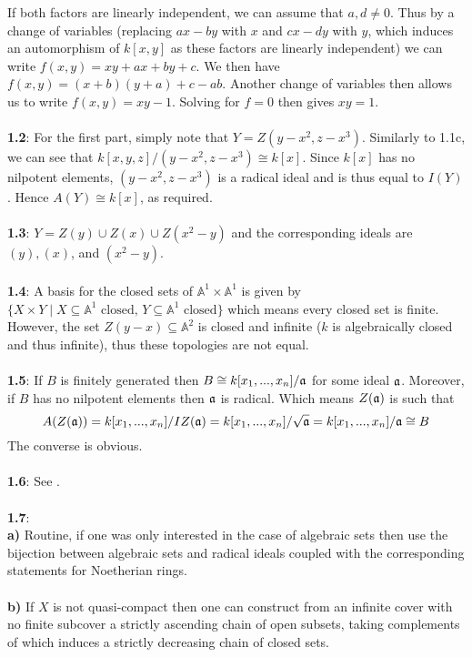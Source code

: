 \documentclass[12pt]{article}
\numberwithin{thm}{subsection}
\numberwithin{defn}{subsection}
\numberwithin{lemma}{subsection}
\numberwithin{example}{subsection}
\numberwithin{notation}{subsection}
\numberwithin{cor}{subsection}
\numberwithin{remark}{subsection}
\numberwithin{condition}{subsection}
\numberwithin{question}{subsection}
\numberwithin{construction}{subsection}
\numberwithin{construction}{subsection}
\numberwithin{construction}{subsection}
\newcommand{\bb}[1]{\mathbb{#1}}
\begin{document}
        If both factors are linearly independent, we can assume that $a,d\neq 0$. Thus by a change of variables (replacing $ax-by$ with $x$ and $cx-dy$ with $y$, which induces an automorphism of $k[x,y]$ as these factors are linearly independent) we can write $f(x,y)=xy+ax+by+c$. We then have $f(x,y)=(x+b)(y+a)+c-ab$. Another change of variables then allows us to write $f(x,y)=xy-1$. Solving for $f=0$ then gives $xy=1$.\\\\
%
\textbf{1.2}: For the first part, simply note that $Y=Z(y-x^2,z-x^3)$. Similarly to 1.1c, we can see that $k[x,y,z]/(y-x^2,z-x^3)\cong k[x]$. Since $k[x]$ has no nilpotent elements, $(y-x^2,z-x^3)$ is a radical ideal and is thus equal to $I(Y)$. Hence $A(Y)\cong k[x]$, as required.\\\\
%
\textbf{1.3}: $Y = Z(y) \cup Z(x) \cup Z(x^2 - y)$ and the corresponding ideals are $(y), (x)$, and $(x^2 - y)$.\\\\
%
\textbf{1.4}: A basis for the closed sets of $\bb{A}^1 \times \bb{A}^1$ is given by $\lbrace X \times Y \mid X \subseteq \bb{A}^1\text{ closed, }Y \subseteq \bb{A}^1\text{ closed}\rbrace$ which means every closed set is finite. However, the set $Z(y -x) \subseteq \bb{A}^2$ is closed and infinite ($k$ is algebraically closed and thus infinite), thus these topologies are not equal.\\\\
%
\textbf{1.5}: If $B$ is finitely generated then $B \cong k[x_1,...,x_n]/\frak{a}$ for some ideal $\frak{a}$. Moreover, if $B$ has no nilpotent elements then $\frak{a}$ is radical. Which means $Z(\frak{a})$ is such that
\[A(Z(\frak{a})) = k[x_1,...,x_n]/IZ(\frak{a}) = k[x_1,...,x_n]/\sqrt{\frak{a}} = k[x_1,...,x_n]/\frak{a} \cong B\]
The converse is obvious.\\\\
%
\textbf{1.6}: See \cite{varieties}.\\\\
%
\textbf{1.7}:\\
%
\textbf{a)} Routine, if one was only interested in the case of algebraic sets then use the bijection between algebraic sets and radical ideals coupled with the corresponding statements for Noetherian rings.\\\\
%
\textbf{b)} If $X$ is not quasi-compact then one can construct from an infinite cover with no finite subcover a strictly ascending chain of open subsets, taking complements of which induces a strictly decreasing chain of closed sets.\\\\
\end{document}
